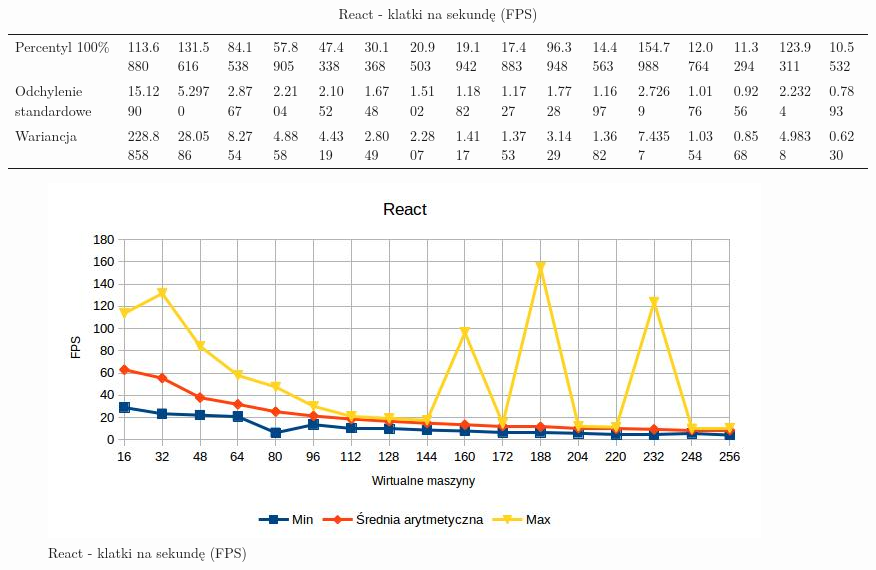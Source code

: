\documentclass[polish, twoside, 12pt]{mwart}
\begin{document}
\begin{table}[]
{\begin{tabular}{@{}lllllllllllllllll@{}}
  Percentyl 100\%        & 113.6880 & 131.5616 & 84.1538 & 57.8905 & 47.4338 & 30.1368 & 20.9503 & 19.1942 & 17.4883 & 96.3948 & 14.4563 & 154.7988 & 12.0764 & 11.3294 & 123.9311       & 10.5532 \\
  Odchylenie standardowe & 15.1290  & 5.2970   & 2.8767  & 2.2104  & 2.1052  & 1.6748  & 1.5102  & 1.1882  & 1.1727  & 1.7728  & 1.1697  & 2.7269   & 1.0176  & 0.9256  & 2.2324         & 0.7893  \\
  Wariancja              & 228.8858 & 28.0586  & 8.2754  & 4.8858  & 4.4319  & 2.8049  & 2.2807  & 1.4117  & 1.3753  & 3.1429  & 1.3682  & 7.4357   & 1.0354  & 0.8568  & 4.9838         & 0.6230  \\ \bottomrule
  \end{tabular}%
  }
  \caption{React - klatki na sekundę (FPS)}
  \label{tab:react-fps}
\end{table}

\begin{figure}[ht]
  \includegraphics[width=\textwidth]{react-fps.jpg}
  \caption{React - klatki na sekundę (FPS)}
  \label{fig:react-fps}
\end{figure}
\end{document}
